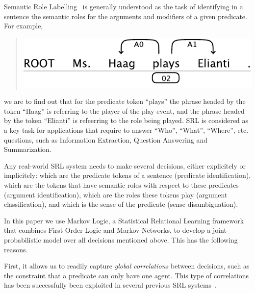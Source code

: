 
Semantic Role Labelling~\citep[SRL, ][]{marquez08srl}
is generally understood as the task of identifying in a sentence the semantic 
roles for the 
arguments and modifiers of a given predicate. For example,
\begin{quote}
\begin{center}
    \includegraphics[scale=.62]{example_ms_haag}
\end{center}
\end{quote}
we are to find out that for the predicate token {}``plays'' the
phrase headed by the token {}``Haag'' is referring to the player of the play event, and
the phrase headed by the token {}``Elianti''  is refeerring to the role
being played.
SRL is considered as a key task for applications that require to
answer {}``Who'', {}``What'', {}``Where'', etc. questions, such
as Information Extraction, Question Answering and Summarization. 

Any real-world SRL system needs to make several decisions, either
explicitely or implicitely: which are the predicate tokens of a sentence
(predicate identification), which are the tokens that have semantic
roles with respect to these predicates (argument identification),
which are the roles these tokens play (argument classification), and
which is the sense of the predicate (sense disambiguation).

In this paper we use Markov Logic, a Statistical Relational Learning
framework that combines First Order Logic and Markov Networks, to
develop a joint probabilistic model over all decisions mentioned above.
This has the following reasons. %

First, it allows us to readily capture \emph{global correlations}
between decisions, such as the constraint that a predicate can only
have one agent. This type of correlations has been successfully been
exploited in several previous SRL systems~\citep{toutanova05joint,punyakanok05generalized}. 

